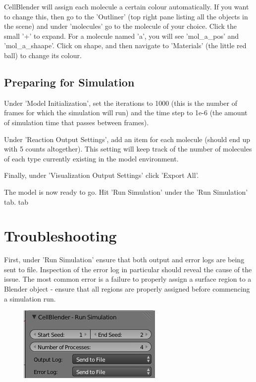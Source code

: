 \documentclass[twoside,a4paper]{refart}
\begin{document}
CellBlender will assign each molecule a certain colour automatically. If you want to change this, then go to the 'Outliner' (top right pane listing all the objects in the scene) and under 'molecules' go to the molecule of your choice. Click the small '+' to expand. For a molecule named 'a', you will see 'mol\_a\_pos' and 'mol\_a\_shaape'. Click on shape, and then navigate to 'Materials' (the little red ball) to change its colour.

\subsection{Preparing for Simulation}
Under 'Model Initialization', set the iterations to 1000 (this is the number of frames for which the simulation will run) and the time step to 1e-6 (the amount of simulation time that passes between frames).

Under 'Reaction Output Settings', add an item for each molecule (should end up with 5 counts altogether). This setting will keep track of the number of molecules of each type currently existing in the model environment.

Finally, under 'Visualization Output Settings' click 'Export All'.

The model is now ready to go. Hit 'Run Simulation' under the 'Run Simulation' tab.
tab
\section{Troubleshooting}
 First, under 'Run Simulation' ensure that both output and error logs are being sent to file. Inspection of the error log in particular should reveal the cause of the issue. The most common error is a failure to properly assign a surface region to a Blender object - ensure that all regions are properly assigned before commencing a simulation run.

    \begin{figure}[H]
        \includegraphics[scale=0.5]{trouble1.png}
    \end{figure}
\end{document}
